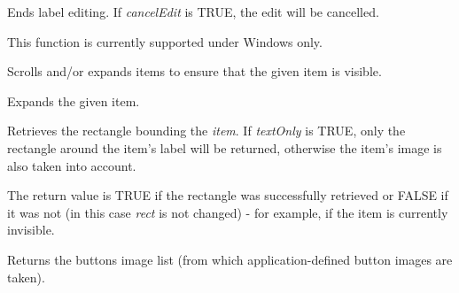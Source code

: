 \label{wxtreectrlendeditlabel}


Ends label editing. If {\it cancelEdit} is TRUE, the edit will be cancelled.

This function is currently supported under Windows only.



\label{wxtreectrlensurevisible}


Scrolls and/or expands items to ensure that the given item is visible.

\label{wxtreectrlexpand}


Expands the given item.

\label{wxtreectrlgetitemrect}


Retrieves the rectangle bounding the {\it item}. If {\it textOnly} is TRUE,
only the rectangle around the item's label will be returned, otherwise the
item's image is also taken into account.

The return value is TRUE if the rectangle was successfully retrieved or FALSE
if it was not (in this case {\it rect} is not changed) - for example, if the
item is currently invisible.



\label{wxtreectrlgetbuttonsimagelist}


Returns the buttons image list (from which application-defined button images are taken).

